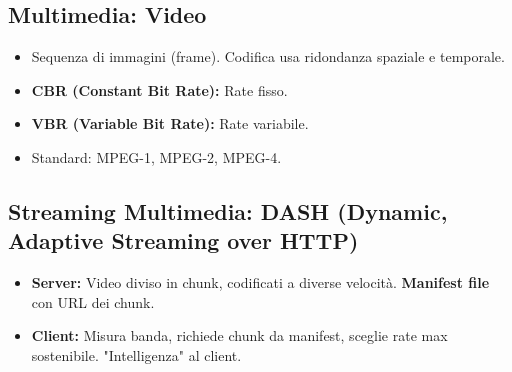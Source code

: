\subsection{Multimedia: Video}
\begin{itemize}
    \item Sequenza di immagini (frame). Codifica usa ridondanza spaziale e temporale.
    \item \textbf{CBR (Constant Bit Rate):} Rate fisso.
    \item \textbf{VBR (Variable Bit Rate):} Rate variabile.
    \item Standard: MPEG-1, MPEG-2, MPEG-4.
\end{itemize}

\subsection{Streaming Multimedia: DASH (Dynamic, Adaptive Streaming over HTTP)}
\begin{itemize}
    \item \textbf{Server:} Video diviso in chunk, codificati a diverse velocità. \textbf{Manifest file} con URL dei chunk.
    \item \textbf{Client:} Misura banda, richiede chunk da manifest, sceglie rate max sostenibile. "Intelligenza" al client.
\end{itemize}

